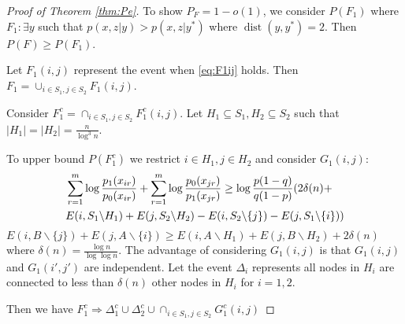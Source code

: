 \documentclass[conference]{IEEEtran}
\DeclareMathOperator{\dist}{dist}
\begin{document}
\begin{proof}[Proof of Theorem \ref{thm:Pe}]
To show $P_F = 1 - o(1)$, we consider $P(F_1)$ where
$F_1: \exists y$ such that $p(x,z|y) > p(x,z|y^*)$ where $\dist(y,y^*)=2$.
Then $P(F) \geq P(F_1)$.

Let $F_1(i,j)$ represent the event when \eqref{eq:F1ij} holds. Then $F_1 = \cup_{i \in S_1,j \in S_2}F_1(i,j)$.

Consider $F_1^c = \cap_{i\in S_1, j\in S_2} F_1^c(i,j)$.
Let $H_1\subseteq S_1, H_2 \subseteq S_2$ such that $|H_1| = |H_2| = \frac{n}{\log^3 n}$.

To upper bound $P(F_1^c)$ we restrict $i \in H_1, j \in H_2$ and consider
$G_1(i,j)$:
\begin{align}
&\sum_{r=1}^{m} \log \frac{p_1(x_{ir})}{p_0(x_{ir})}
+\sum_{r=1}^{m} \log \frac{p_0(x_{jr})}{p_1(x_{jr})}
\geq\log \frac{p(1-q)}{q(1-p)} (2\delta(n) + \notag\\
& E(i, S_1 \backslash H_1) + E(j, S_2 \backslash H_2)
- E(i, S_2 \backslash \{j\}) - E(j, S_1 \backslash \{i\})) \label{eq:G1ij}
\end{align}
$E(i, B \backslash \{j\}) + E(j, A \backslash \{i\}) \geq E(i, A \backslash H_1) + E(j, B \backslash H_2) + 2\delta(n)$
where $\delta(n) = \frac{\log n}{\log \log n}$.
The advantage of considering $G_1(i,j)$ is that $G_1(i,j)$ and $G_1(i', j')$ are independent.
Let the event $\Delta_i$ represents all nodes in $H_i$ are connected to less than $\delta(n)$ other nodes in $H_i$ for $i=1,2$.

Then we have $F_1^c \Rightarrow \Delta_1^c \cup \Delta_2^c \cup \cap_{i\in S_1, j\in S_2}G^c_1(i,j)$


\end{proof}
\end{document}
